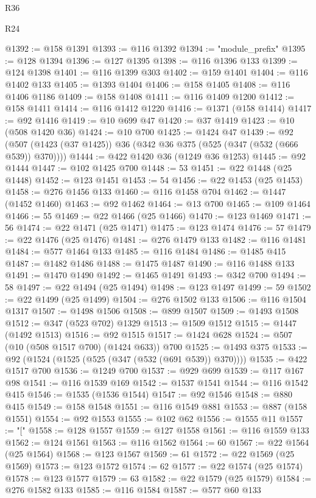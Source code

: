 \begin{lexlean}{R36}
\begin{lexlean}{R24}
\begin{coremodule}
{{{{{{{{{{{{{{{{{{{{{{{{{{{{{{{{{{{{{{{{{{{{{{{{{{{{{{{{{{{{{{{{{{{{{{{{{{{{{{{{{{{{{{{{{{{{{{{{{{{{{{{{{{{{{{{{{{{{{{{{{{{{{{{{{{{{{{{{{{{{{{{{{{{{{{{{{{{{{{{{{{{{{{{{{{{{{{{{{{{{{{{{{{{{{{{{{{{@1392 := @158 @1391
@1393 := @116 @1392
@1394 := "module_prefix"
@1395 := @128 @1394
@1396 := @127 @1395
@1398 := @116 @1396 @133
@1399 := @124 @1398
@1401 := @116 @1399 @303
@1402 := @159 @1401
@1404 := @116 @1402 @133
@1405 := @1393 @1404
@1406 := @158 @1405
@1408 := @116 @1406 @1186
@1409 := @158 @1408
@1411 := @116 @1409 @1200
@1412 := @158 @1411
@1414 := @116 @1412 @1220
@1416 := @1371 (@158 @1414)
@1417 := @92 @1416
@1419 := @10 @699 @47
@1420 := @37 @1419
@1423 := @10 (@508 @1420 @36)
@1424 := @10 @700
@1425 := @1424 @47
@1439 := @92 (@507 (@1423 (@37 @1425)) @36 (@342 @36 @375 (@525 (@347 (@532 (@666 @539)) @370))))
@1444 := @422 @1420 @36 (@1249 @36 @1253)
@1445 := @92 @1444
@1447 := @102 @1425 @700
@1448 := 53
@1451 := @22 @1448 (@25 @1448)
@1452 := @123 @1451
@1453 := 54
@1456 := @22 @1453 (@25 @1453)
@1458 := @276 @1456 @133
@1460 := @116 @1458 @704
@1462 := @1447 (@1452 @1460)
@1463 := @92 @1462
@1464 := @13 @700
@1465 := @109 @1464
@1466 := 55
@1469 := @22 @1466 (@25 @1466)
@1470 := @123 @1469
@1471 := 56
@1474 := @22 @1471 (@25 @1471)
@1475 := @123 @1474
@1476 := 57
@1479 := @22 @1476 (@25 @1476)
@1481 := @276 @1479 @133
@1482 := @116 @1481
@1484 := @577 @1464 @133
@1485 := @116 @1484
@1486 := @1485 @415
@1487 := @1482 @1486
@1488 := @1475 @1487
@1490 := @116 @1488 @133
@1491 := @1470 @1490
@1492 := @1465 @1491
@1493 := @342 @700
@1494 := 58
@1497 := @22 @1494 (@25 @1494)
@1498 := @123 @1497
@1499 := 59
@1502 := @22 @1499 (@25 @1499)
@1504 := @276 @1502 @133
@1506 := @116 @1504 @1317
@1507 := @1498 @1506
@1508 := @899 @1507
@1509 := @1493 @1508
@1512 := @347 (@523 @702) @1329
@1513 := @1509 @1512
@1515 := @1447 (@1492 @1513)
@1516 := @92 @1515
@1517 := @1424 @628
@1524 := @507 (@10 (@508 @1517 @700) (@1424 @633)) @700
@1525 := @1493 @375
@1533 := @92 (@1524 (@1525 (@525 (@347 (@532 (@691 @539)) @370))))
@1535 := @422 @1517 @700
@1536 := @1249 @700
@1537 := @929 @699
@1539 := @117 @167 @98
@1541 := @116 @1539 @169
@1542 := @1537 @1541
@1544 := @116 @1542 @415
@1546 := @1535 (@1536 @1544)
@1547 := @92 @1546
@1548 := @880 @415
@1549 := @158 @1548
@1551 := @116 @1549 @881
@1553 := @887 (@158 @1551)
@1554 := @92 @1553
@1555 := @102 @62
@1556 := @1555 @11
@1557 := "["
@1558 := @128 @1557
@1559 := @127 @1558
@1561 := @116 @1559 @133
@1562 := @124 @1561
@1563 := @116 @1562
@1564 := 60
@1567 := @22 @1564 (@25 @1564)
@1568 := @123 @1567
@1569 := 61
@1572 := @22 @1569 (@25 @1569)
@1573 := @123 @1572
@1574 := 62
@1577 := @22 @1574 (@25 @1574)
@1578 := @123 @1577
@1579 := 63
@1582 := @22 @1579 (@25 @1579)
@1584 := @276 @1582 @133
@1585 := @116 @1584
@1587 := @577 @60 @133
}}}}}}}}}}}}}}}}}}}}}}}}}}}}}}}}}}}}}}}}}}}}}}}}}}}}}}}}}}}}}}}}}}}}}}}}}}}}}}}}}}}}}}}}}}}}}}}}}}}}}}}}}}}}}}}}}}}}}}}}}}}}}}}}}}}}}}}}}}}}}}}}}}}}}}}}}}}}}}}}}}}}}}}}}}}}}}}}}}}}}}}}}}}}}}}}}}}
\end{coremodule}
\end{lexlean}
\end{lexlean}
